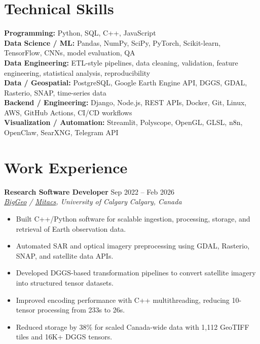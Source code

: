 \documentclass[a4paper,10pt]{article}
\newcommand{\resumeSubheading}[4]{
    \textbf{#1} \hfill #2 \\
    \textit{#3} \hfill \textit{#4}
}
\begin{document}
\section*{Technical Skills}

\textbf{Programming:} Python, SQL, C++, JavaScript \\
\textbf{Data Science / ML:} Pandas, NumPy, SciPy, PyTorch, Scikit-learn, TensorFlow, CNNs, model evaluation, QA \\
\textbf{Data Engineering:} ETL-style pipelines, data cleaning, validation, feature engineering, statistical analysis, reproducibility \\
\textbf{Data / Geospatial:} PostgreSQL, Google Earth Engine API, DGGS, GDAL, Rasterio, SNAP, time-series data \\
\textbf{Backend / Engineering:} Django, Node.js, REST APIs, Docker, Git, Linux, AWS, GitHub Actions, CI/CD workflows \\
\textbf{Visualization / Automation:} Streamlit, Polyscope, OpenGL, GLSL, n8n, OpenClaw, SearXNG, Telegram API


\section*{Work Experience}

\resumeSubheading
{Research Software Developer}
{Sep 2022 -- Feb 2026}
{\href{https://biggeo.com}{BigGeo} / \href{https://www.mitacs.ca/}{Mitacs}, University of Calgary}
{Calgary, Canada}
\begin{itemize}[leftmargin=0.25in]
    \item Built C++/Python software for scalable ingestion, processing, storage, and retrieval of Earth observation data.
    \item Automated SAR and optical imagery preprocessing using GDAL, Rasterio, SNAP, and satellite data APIs.
    \item Developed DGGS-based transformation pipelines to convert satellite imagery into structured tensor datasets.
    \item Improved encoding performance with C++ multithreading, reducing 10-tensor processing from 233s to 26s.
    \item Reduced storage by 38\% for scaled Canada-wide data with 1,112 GeoTIFF tiles and 16K+ DGGS tensors.
\end{itemize}
\end{document}
